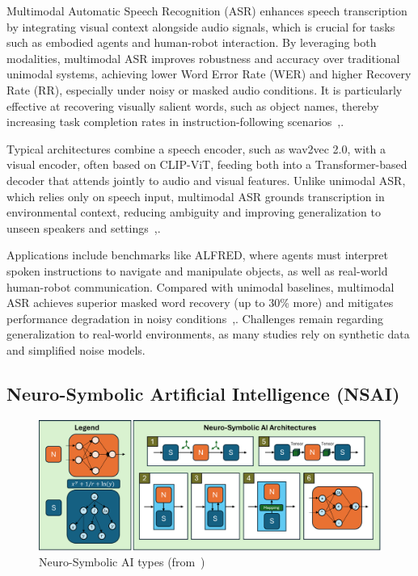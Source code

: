 \documentclass[12pt]{extarticle}
\begin{document}
Multimodal Automatic Speech Recognition (ASR) enhances speech transcription by integrating visual context alongside audio signals, which is crucial for tasks such as embodied agents and human-robot interaction. By leveraging both modalities, multimodal ASR improves robustness and accuracy over traditional unimodal systems, achieving lower Word Error Rate (WER) and higher Recovery Rate (RR), especially under noisy or masked audio conditions. It is particularly effective at recovering visually salient words, such as object names, thereby increasing task completion rates in instruction-following scenarios~\cite{Chang2023},\cite{multi}.

Typical architectures combine a speech encoder, such as wav2vec 2.0, with a visual encoder, often based on CLIP-ViT, feeding both into a Transformer-based decoder that attends jointly to audio and visual features. Unlike unimodal ASR, which relies only on speech input, multimodal ASR grounds transcription in environmental context, reducing ambiguity and improving generalization to unseen speakers and settings~\cite{Chang2023},\cite{multi}.

Applications include benchmarks like ALFRED, where agents must interpret spoken instructions to navigate and manipulate objects, as well as real-world human-robot communication. Compared with unimodal baselines, multimodal ASR achieves superior masked word recovery (up to 30\% more) and mitigates performance degradation in noisy conditions~\cite{Chang2023},\cite{multi}. Challenges remain regarding generalization to real-world environments, as many studies rely on synthetic data and simplified noise models.

\subsection{Neuro-Symbolic Artificial Intelligence (NSAI)}

\begin{figure}[htbp]
    \centering
    \includegraphics[width=0.8\linewidth]{nsai-types}
    \caption{Neuro-Symbolic AI types
    (from~\cite{nsai})}
    \label{fig:nsai-types}
\end{figure}
\end{document}
